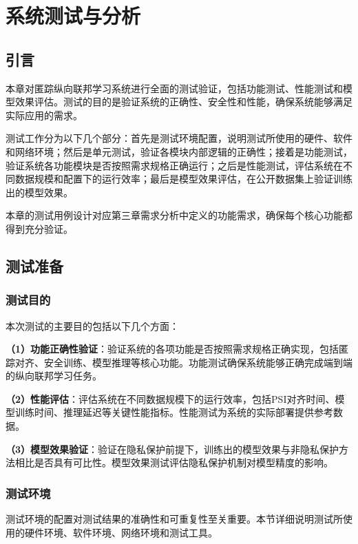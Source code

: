 \chapter{系统测试与分析}
\label{chap:test}

\section{引言}
\label{sec:test-intro}

本章对匿踪纵向联邦学习系统进行全面的测试验证，包括功能测试、性能测试和模型效果评估。测试的目的是验证系统的正确性、安全性和性能，确保系统能够满足实际应用的需求。

测试工作分为以下几个部分：首先是测试环境配置，说明测试所使用的硬件、软件和网络环境；然后是单元测试，验证各模块内部逻辑的正确性；接着是功能测试，验证系统各功能模块是否按照需求规格正确运行；之后是性能测试，评估系统在不同数据规模和配置下的运行效率；最后是模型效果评估，在公开数据集上验证训练出的模型效果。

本章的测试用例设计对应第三章需求分析中定义的功能需求，确保每个核心功能都得到充分验证。

\section{测试准备}
\label{sec:test-prep}

\subsection{测试目的}
\label{subsec:test-purpose}

本次测试的主要目的包括以下几个方面：

\textbf{（1）功能正确性验证}：验证系统的各项功能是否按照需求规格正确实现，包括匿踪对齐、安全训练、模型推理等核心功能。功能测试确保系统能够正确完成端到端的纵向联邦学习任务。

\textbf{（2）性能评估}：评估系统在不同数据规模下的运行效率，包括PSI对齐时间、模型训练时间、推理延迟等关键性能指标。性能测试为系统的实际部署提供参考数据。

\textbf{（3）模型效果验证}：验证在隐私保护前提下，训练出的模型效果与非隐私保护方法相比是否具有可比性。模型效果测试评估隐私保护机制对模型精度的影响。

\subsection{测试环境}
\label{subsec:test-env}

测试环境的配置对测试结果的准确性和可重复性至关重要。本节详细说明测试所使用的硬件环境、软件环境、网络环境和测试工具。

